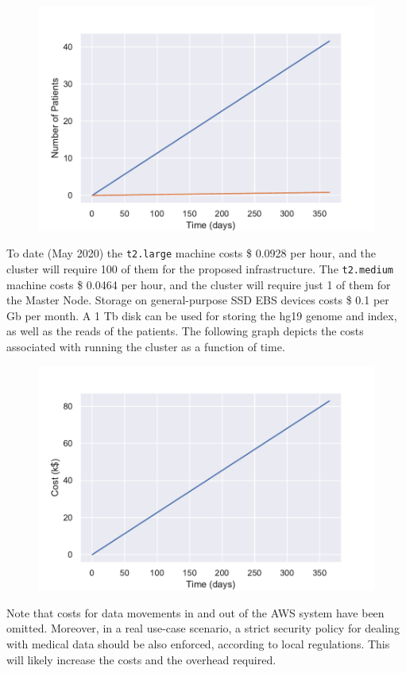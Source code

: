 \documentclass{article}
\begin{document}
\begin{figure}[!h]
    \center%
    \includegraphics[width=.8\textwidth]{./images/patient_graph.pdf}
\end{figure}
\FloatBarrier%

To date (May 2020) the \texttt{t2.large} machine costs \$ 0.0928 per hour, and the cluster will require 100 of them for the proposed infrastructure.
The \texttt{t2.medium} machine costs \$ 0.0464 per hour, and the cluster will require just 1 of them for the Master Node.
Storage on general-purpose SSD EBS devices costs \$ 0.1 per Gb per month.
A 1 Tb disk can be used for storing the hg19 genome and index, as well as the reads of the patients.
The following graph depicts the costs associated with running the cluster as a function of time.

\begin{figure}[!h]
    \center%
    \includegraphics[width=.8\textwidth]{./images/cost_graph.pdf}
\end{figure}

\FloatBarrier%

Note that costs for data movements in and out of the AWS system have been omitted.
Moreover, in a real use-case scenario, a strict security policy for dealing with medical data should be also enforced, according to local regulations.
This will likely increase the costs and the overhead required.
\end{document}
